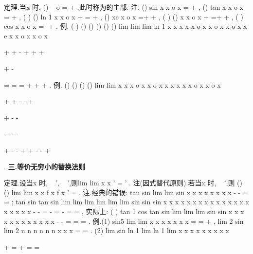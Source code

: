 \textcolor{lyred}{定理}.当x \to \Omega 时,
()
~
o
\beta 
\alpha 
\beta 
\alpha 
\alpha 
\Leftrightarrow 
=
+
,此时称\alpha 为\beta 的\textcolor{lyred}{主部}. 
\textcolor{lyred}{注}.
()
sin x
x
o x
=
+
,
()
tan x
x
o x
=
+
,
(
)
()
ln 1
x
x
o x
+
=
+
,
()
xe
x
o x
=+
+
, 
(
)
()
x
x
o x
\alpha 
\alpha 
+
=+
+
,
(
)
cos
x
x
o x
=-
+
. 
\textcolor{lyred}{例}.
(
)
()
()
()
()
()
lim
lim
lim
ln 1
x
x
x
x
x
o x
x
o x
x
o x
x
e
x
x
o x
x
o x
\to 
\to 
\to 




+
+
-
+
+
+




+
-




=
=
=
+
+
+
. 
\textcolor{lyred}{例}.
()
()
()
()
lim
lim
x
x
x
o x
x
o x
x
x
x
x
x
o x
x
o x
\to 
\to 




+
+
-
-
+




+
-
-




=
=




+
-
-
+
+
-
-
+








. 
\vspace{4pt}
{\bfseries \textcolor{lyred}{三.等价无穷小的替换法则}}

\textcolor{lyred}{定理}.设当x \to \Omega 时,
~
\alpha 
\alpha ',
~
\beta 
\beta ',则lim
lim
x
x
\beta 
\beta 
\alpha 
\alpha 
\to 
\to 
'
=
'
\Omega 
\Omega 
. 
\textcolor{lyred}{注(因式替代原则)}.若当x \to \Omega 时,
~
\alpha 
\alpha ',则
()
()
lim
lim
x
x
f x
f x
\alpha 
\alpha 
\to 
\to 
'
=
\Omega 
\Omega 
. 
\textcolor{lyred}{注}.经典的错误:
tan
sin
lim
lim
sin
x
x
x
x
x
x
x
x
\to 
\to 
-
-
=
=
; 
tan
sin
tan
sin
lim
lim
lim
lim
lim
lim
sin
sin
sin
x
x
x
x
x
x
x
x
x
x
x
x
x
x
x
x
x
x
x
x
\to 
\to 
\to 
\to 
\to 
\to 
-
-
=
-
=
-
=
=
, 
实际上:
(
)
tan
1 cos
tan
sin
lim
lim
lim
sin
sin
x
x
x
x
x
x
x
x
x
x
x
x
\to 
\to 
\to 
-
\cdots 
-
=
=
=
. 
\textcolor{lyred}{例}.(1)
sin5
lim
lim
x
x
x
x
x
x
x
\to 
\to 
=
=
+
, lim 2 sin
lim 2
n
n
n
n
n
n
x
x
x
\to \infty 
\to \infty 
=
\cdots 
=
. 
(2)
lim sin ln 1
lim ln 1
lim
x
x
x
x
x
x
x
x
x
\to \infty 
\to \infty 
\to \infty 




+
=
+
=
\cdots 
=








